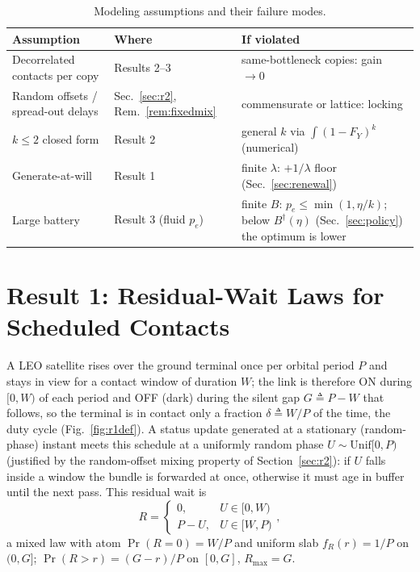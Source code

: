 \documentclass[twocolumn,3p,times,procedia]{elsarticle}
\theoremstyle{plain}
\theoremstyle{remark}
\newcommand{\Prob}{\Pr}
\newcommand{\peff}{p_e}
\begin{document}
\begin{table}[t]
\caption{Modeling assumptions and their failure modes.}
\label{tab:assumptions}
\centering
\renewcommand{\arraystretch}{1.2}
\begin{tabular}{p{2.5cm}p{1.1cm}p{3.3cm}}
\hline
Assumption & Where & If violated \\
\hline
Decorrelated contacts per copy & Results 2--3 & same-bottleneck copies: gain $\to 0$ \\
Random offsets / spread-out delays & Sec.~\ref{sec:r2}, Rem.~\ref{rem:fixedmix} & commensurate or lattice: locking \\
$k\le 2$ closed form & Result 2 & general $k$ via $\int(1-F_Y)^k$ (numerical) \\
Generate-at-will & Result 1 & finite $\lambda$: $+1/\lambda$ floor (Sec.~\ref{sec:renewal}) \\
Large battery & Result 3 (fluid $\peff$) & finite $B$: $\peff\le\min(1,\eta/k)$; below $B^{\dagger}(\eta)$ (Sec.~\ref{sec:policy}) the optimum is lower \\
\hline
\end{tabular}
\end{table}

\section{Result 1: Residual-Wait Laws for Scheduled
Contacts}\label{sec:r1}
A LEO satellite rises over the ground terminal once per orbital period
$P$ and stays in view for a contact window of duration $W$; the link is
therefore ON during $[0,W)$ of each period and OFF (dark) during the
silent gap $G\triangleq P-W$ that follows, so the terminal is in contact
only a fraction $\delta\triangleq W/P$ of the time, the duty cycle
(Fig.~\ref{fig:r1def}). A status update generated at a stationary
(random-phase) instant meets this schedule at a uniformly random phase $U\sim\mathrm{Unif}[0,P)$
(justified by the random-offset mixing property of
Section~\ref{sec:r2}): if $U$ falls inside a window the
bundle is forwarded at once, otherwise it must age in buffer until the
next pass. This residual wait is
\begin{equation}
R=\begin{cases}0,& U\in[0,W)\\ P-U,& U\in[W,P)\end{cases},
\end{equation}
a mixed law with atom $\Prob(R=0)=W/P$ and uniform slab $f_R(r)=1/P$ on
$(0,G]$; $\Prob(R>r)=(G-r)/P$ on $[0,G]$, $R_{\max}=G$.
\end{document}
